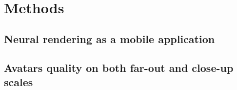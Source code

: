 \chapter{Methods}\label{chapter:methods}

\section{Neural rendering as a mobile application}
\label{methods:app}

\section{Avatars quality on both far-out and close-up scales}
\label{methods:zooms}